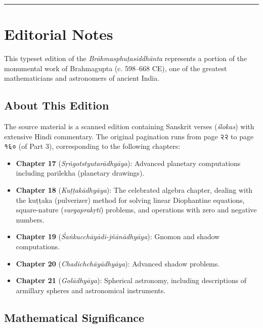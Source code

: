 \documentclass[11pt,a4paper]{article}
\newcommand{\longline}{\noindent\rule{\textwidth}{0.4pt}}
\begin{document}
\vspace{2em}
\longline

\newpage
\section*{Editorial Notes}

This typeset edition of the \textit{Brāhmasphuṭasiddhānta} represents a portion of the monumental work of Brahmagupta (c. 598–668 CE), one of the greatest mathematicians and astronomers of ancient India.

\subsection*{About This Edition}

The source material is a scanned edition containing Sanskrit verses (\textit{ślokas}) with extensive Hindi commentary. The original pagination runs from page २२ to page १६० (of Part 3), corresponding to the following chapters:

\begin{itemize}
  \item \textbf{Chapter 17} (\textit{Sṛṅgotstyutarādhyāya}): Advanced planetary computations including parilekha (planetary drawings).
  \item \textbf{Chapter 18} (\textit{Kuṭṭakādhyāya}): The celebrated algebra chapter, dealing with the kuṭṭaka (pulverizer) method for solving linear Diophantine equations, square-nature (\textit{vargaprakṛti}) problems, and operations with zero and negative numbers.
  \item \textbf{Chapter 19} (\textit{Śaṅkucchāyādi-jñānādhyāya}): Gnomon and shadow computations.
  \item \textbf{Chapter 20} (\textit{Chadichchāyādhyāya}): Advanced shadow problems.
  \item \textbf{Chapter 21} (\textit{Golādhyāya}): Spherical astronomy, including descriptions of armillary spheres and astronomical instruments.
\end{itemize}

\subsection*{Mathematical Significance}
\end{document}

